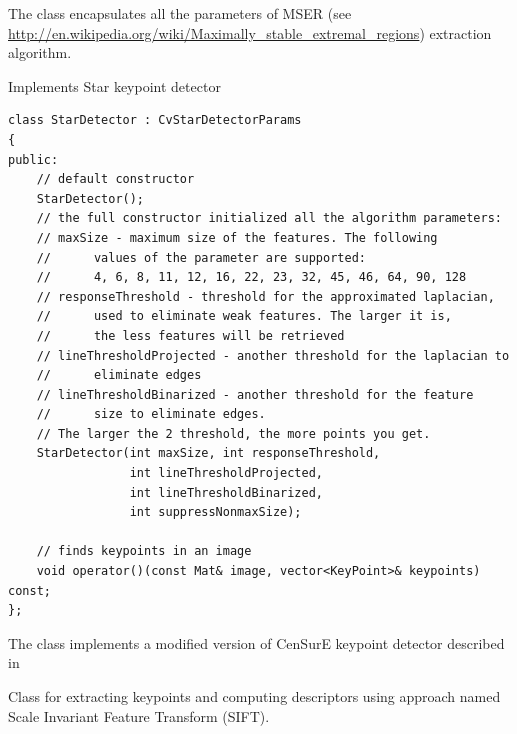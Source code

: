 The class encapsulates all the parameters of MSER (see \url{http://en.wikipedia.org/wiki/Maximally_stable_extremal_regions}) extraction algorithm. 

Implements Star keypoint detector

\begin{lstlisting}
class StarDetector : CvStarDetectorParams
{
public:
    // default constructor
    StarDetector();
    // the full constructor initialized all the algorithm parameters:
    // maxSize - maximum size of the features. The following 
    //      values of the parameter are supported:
    //      4, 6, 8, 11, 12, 16, 22, 23, 32, 45, 46, 64, 90, 128
    // responseThreshold - threshold for the approximated laplacian,
    //      used to eliminate weak features. The larger it is,
    //      the less features will be retrieved
    // lineThresholdProjected - another threshold for the laplacian to 
    //      eliminate edges
    // lineThresholdBinarized - another threshold for the feature 
    //      size to eliminate edges.
    // The larger the 2 threshold, the more points you get.
    StarDetector(int maxSize, int responseThreshold,
                 int lineThresholdProjected,
                 int lineThresholdBinarized,
                 int suppressNonmaxSize);

    // finds keypoints in an image
    void operator()(const Mat& image, vector<KeyPoint>& keypoints) const;
};
\end{lstlisting}

The class implements a modified version of CenSurE keypoint detector described in
\cite{Agrawal08}

Class for extracting keypoints and computing descriptors using approach named Scale Invariant Feature Transform (SIFT).

